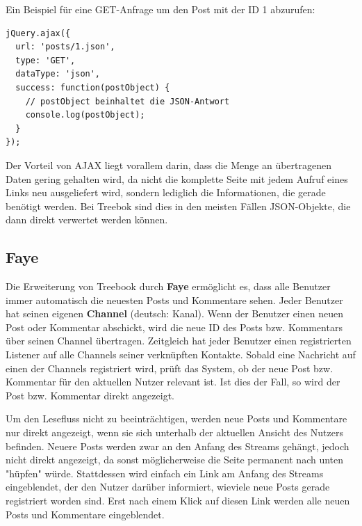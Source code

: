 \documentclass[10pt,a4paper]{book}
\begin{document}
Ein Beispiel für eine GET-Anfrage um den Post mit der ID 1 abzurufen:
\begin{lstlisting}
jQuery.ajax({
  url: 'posts/1.json',
  type: 'GET',
  dataType: 'json',
  success: function(postObject) {
    // postObject beinhaltet die JSON-Antwort
    console.log(postObject);
  }
});
\end{lstlisting}

Der Vorteil von AJAX liegt vorallem darin, dass die Menge an übertragenen Daten gering gehalten wird, da nicht die komplette Seite mit jedem Aufruf eines Links neu ausgeliefert wird, sondern lediglich die Informationen, die gerade benötigt werden.
Bei Treebok sind dies in den meisten Fällen JSON-Objekte, die dann direkt verwertet werden können.

\subsection{Faye}
Die Erweiterung von Treebook durch \textbf{Faye} ermöglicht es, dass alle Benutzer immer automatisch die neuesten Posts und Kommentare sehen.
Jeder Benutzer hat seinen eigenen \textbf{Channel} (deutsch: Kanal). Wenn der Benutzer einen neuen Post oder Kommentar abschickt, wird die neue ID des Posts bzw. Kommentars über seinen Channel übertragen.
Zeitgleich hat jeder Benutzer einen registrierten Listener auf alle Channels seiner verknüpften Kontakte. Sobald eine Nachricht auf einen der Channels registriert wird, prüft das System, ob der neue Post bzw. Kommentar für den aktuellen Nutzer relevant ist. Ist dies der Fall, so wird der Post bzw. Kommentar direkt angezeigt.

Um den Lesefluss nicht zu beeinträchtigen, werden neue Posts und Kommentare nur direkt angezeigt, wenn sie sich unterhalb der aktuellen Ansicht des Nutzers befinden.
Neuere Posts werden zwar an den Anfang des Streams gehängt, jedoch nicht direkt angezeigt, da sonst möglicherweise die Seite permanent nach unten "hüpfen" würde.
Stattdessen wird einfach ein Link am Anfang des Streams eingeblendet, der den Nutzer darüber informiert, wieviele neue Posts gerade registriert worden sind. Erst nach einem Klick auf diesen Link werden alle neuen Posts und Kommentare eingeblendet.
\end{document}
